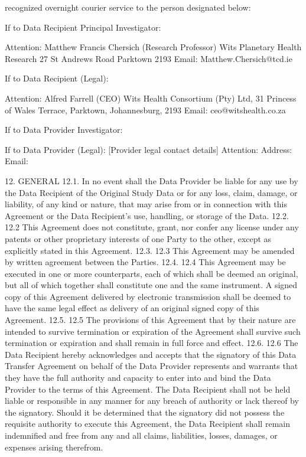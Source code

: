 \documentclass[12pt,letterpaper]{article}
\begin{document}
recognized overnight courier service to the person designated below:

If to Data Recipient Principal Investigator:

Attention: Matthew Francis Chersich (Research Professor) Wits Planetary Health Research 27 St Andrews Road Parktown 2193 Email: Matthew.Chersich@tcd.ie

If to Data Recipient (Legal):

Attention: Alfred Farrell (CEO) Wits Health Consortium (Pty) Ltd, 31 Princess of Wales Terrace, Parktown, Johannesburg, 2193 Email: ceo@witshealth.co.za

If to Data Provider Investigator:

If to Data Provider (Legal): [Provider legal contact details] Attention: Address: Email:

12.	GENERAL 12.1.	In no event shall the Data Provider be liable for any use by the Data Recipient of the Original Study Data or for any loss, claim, damage, or liability, of any kind or nature, that may arise from or in connection with this Agreement or the Data Recipient’s use, handling, or storage of the Data. 12.2.	12.2 This Agreement does not constitute, grant, nor confer any license under any patents or other proprietary interests of one Party to the other, except as explicitly stated in this Agreement. 12.3.	12.3 This Agreement may be amended by written agreement between the Parties. 12.4.	12.4 This Agreement may be executed in one or more counterparts, each of which shall be deemed an original, but all of which together shall constitute one and the same instrument. A signed copy of this Agreement delivered by electronic transmission shall be deemed to have the same legal effect as delivery of an original signed copy of this Agreement. 12.5.	12.5 The provisions of this Agreement that by their nature are intended to survive termination or expiration of the Agreement shall survive such termination or expiration and shall remain in full force and effect. 12.6.	12.6 The Data Recipient hereby acknowledges and accepts that the signatory of this Data Transfer Agreement on behalf of the Data Provider represents and warrants that they have the full authority and capacity to enter into and bind the Data Provider to the terms of this Agreement. The Data Recipient shall not be held liable or responsible in any manner for any breach of authority or lack thereof by the signatory. Should it be determined that the signatory did not possess the requisite authority to execute this Agreement, the Data Recipient shall remain indemnified and free from any and all claims, liabilities, losses, damages, or expenses arising therefrom.
\end{document}
